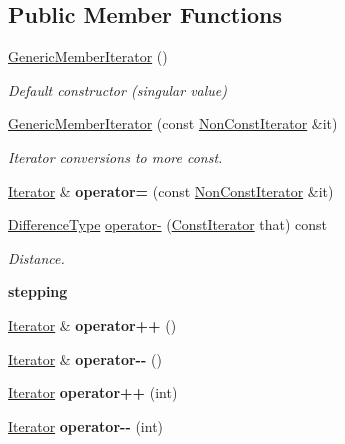 \subsection*{Public Member Functions}
\begin{DoxyCompactItemize}
\item 
\hyperlink{a02004_a2708717d497a0aadacdf75900de4c5b4}{Generic\+Member\+Iterator} ()
\begin{DoxyCompactList}\small\item\em Default constructor (singular value) \end{DoxyCompactList}\item 
\hyperlink{a02004_a2697fd327a90654b0bf91c988e43f95e}{Generic\+Member\+Iterator} (const \hyperlink{a02004_abc26eb06f2962765b11dcd06ce84ac02}{Non\+Const\+Iterator} \&it)
\begin{DoxyCompactList}\small\item\em Iterator conversions to more const. \end{DoxyCompactList}\item 
\mbox{\label{a02004_a4ebb2b80e7d70c11802520ae77958df3}} 
\hyperlink{a02004_ad1cf1ecf6210b47906c9f179c893a8b8}{Iterator} \& {\bfseries operator=} (const \hyperlink{a02004_abc26eb06f2962765b11dcd06ce84ac02}{Non\+Const\+Iterator} \&it)
\item 
\mbox{\label{a02004_ae119ae8ed78dbd980f83d367f59a3c94}} 
\hyperlink{a02004_a902b99c8ae351cd7626514dc5f30740a}{Difference\+Type} \hyperlink{a02004_ae119ae8ed78dbd980f83d367f59a3c94}{operator-\/} (\hyperlink{a02004_ae5be27a73dce0be58ee2776db896d591}{Const\+Iterator} that) const
\begin{DoxyCompactList}\small\item\em Distance. \end{DoxyCompactList}\end{DoxyCompactItemize}
\begin{Indent}\textbf{ stepping}\par
\begin{DoxyCompactItemize}
\item 
\mbox{\label{a02004_afd6c9a104e2285d1d0b50bde53c9109e}} 
\hyperlink{a02004_ad1cf1ecf6210b47906c9f179c893a8b8}{Iterator} \& {\bfseries operator++} ()
\item 
\mbox{\label{a02004_a6db8972f02d74b663b6ef90ee3ff34f6}} 
\hyperlink{a02004_ad1cf1ecf6210b47906c9f179c893a8b8}{Iterator} \& {\bfseries operator-\/-\/} ()
\item 
\mbox{\label{a02004_a83c8be6d960213ce32d68a880a8d9089}} 
\hyperlink{a02004_ad1cf1ecf6210b47906c9f179c893a8b8}{Iterator} {\bfseries operator++} (int)
\item 
\mbox{\label{a02004_a4606c8baec5ea2b5139a503f7caa5444}} 
\hyperlink{a02004_ad1cf1ecf6210b47906c9f179c893a8b8}{Iterator} {\bfseries operator-\/-\/} (int)
\end{DoxyCompactItemize}
\end{Indent}

